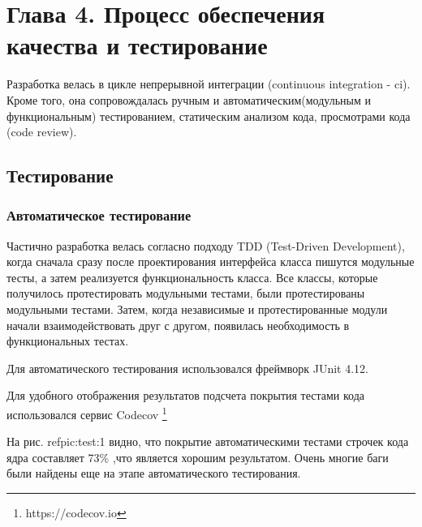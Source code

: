 \section*{Глава 4. Процесс обеспечения качества и тестирование}


Разработка велась в цикле непрерывной интеграции (continuous integration - ci). Кроме того, она сопровождалась ручным и автоматическим(модульным и функциональным) тестированием, статическим анализом кода, просмотрами кода (code review).

\subsection*{Тестирование}

\subsubsection*{Автоматическое тестирование}

Частично разработка велась согласно подходу TDD (Test-Driven Development), когда сначала сразу после проектирования интерфейса класса пишутся модульные тесты, а затем реализуется функциональность класса. Все классы, которые получилось протестировать модульными тестами, были протестированы модульными тестами. Затем, когда независимые и протестированные модули начали взаимодействовать друг с другом, появилась необходимость в функциональных тестах.

Для автоматического тестирования использовался фреймворк JUnit 4.12.

Для удобного отображения результатов подсчета покрытия тестами кода использовался сервис Codecov \footnote{https://codecov.io}

 На рис. ref{pic:test:1} видно, что покрытие автоматическими тестами строчек кода ядра составляет 73\% ,что является хорошим результатом. Очень многие баги были найдены еще на этапе автоматического тестирования.

